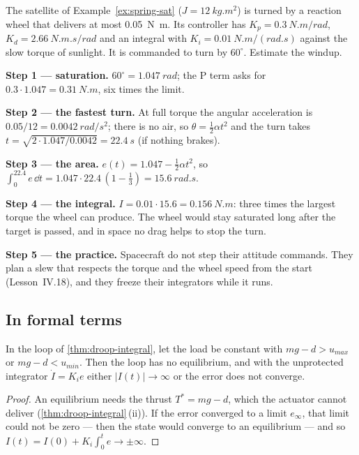 \begin{example}
\label{ex:windup-sat}
The satellite of Example~\ref{ex:spring-sat} ($J = \SI{12}{kg.m^2}$) is turned by a reaction wheel that delivers at most \SI{0.05}{N.m}. Its controller has $K_p = \SI{0.3}{N.m/rad}$, $K_d = \SI{2.66}{N.m.s/rad}$ and an integral with $K_i = \SI{0.01}{N.m/(rad.s)}$ against the slow torque of sunlight. It is commanded to turn by $60^\circ$. Estimate the windup.

\textbf{Step 1 — saturation.} $60^\circ = \SI{1.047}{rad}$; the P term asks for $0.3 \cdot 1.047 = \SI{0.31}{N.m}$, six times the limit.

\textbf{Step 2 — the fastest turn.} At full torque the angular acceleration is $0.05/12 = \SI{0.0042}{rad/s^2}$; there is no air, so $\theta = \tfrac12\alpha t^2$ and the turn takes $t = \sqrt{2 \cdot 1.047/0.0042} = \SI{22.4}{s}$ (if nothing brakes).

\textbf{Step 3 — the area.} $e(t) = 1.047 - \tfrac12\alpha t^2$, so $\int_0^{22.4} e\,\dd t = 1.047 \cdot 22.4\,(1 - \tfrac13) = \SI{15.6}{rad.s}$.

\textbf{Step 4 — the integral.} $I = 0.01 \cdot 15.6 = \SI{0.156}{N.m}$: three times the largest torque the wheel can produce. The wheel would stay saturated long after the target is passed, and in space no drag helps to stop the turn.

\textbf{Step 5 — the practice.} Spacecraft do not step their attitude commands. They plan a slew that respects the torque and the wheel speed from the start (Lesson~IV.18), and they freeze their integrators while it runs.
\end{example}

\subsection{In formal terms}

\begin{theorem}
\label{thm:windup-noeq}
In the loop of \cref{thm:droop-integral}, let the load be constant with $mg - d > u_{max}$ or $mg - d < u_{min}$. Then the loop has no equilibrium, and with the unprotected integrator $\dot I = K_i e$ either $|I(t)| \to \infty$ or the error does not converge.
\end{theorem}
\begin{proof}
An equilibrium needs the thrust $T^* = mg - d$, which the actuator cannot deliver (\cref{thm:droop-integral}\,(ii)). If the error converged to a limit $e_\infty$, that limit could not be zero — then the state would converge to an equilibrium — and so $I(t) = I(0) + K_i\int_0^t e \to \pm\infty$.
\end{proof}


